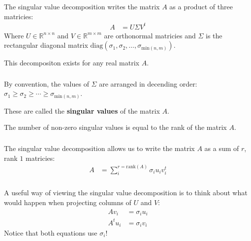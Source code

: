 \begin{frame}[fragile] \frametitle{}

The singular value decomposition writes the matrix $A$ as a product
of three matricies:
\begin{align*}
A &= U \Sigma V^t
\end{align*}
Where $U \in \mathbb{R}^{n\times n}$ and $V \in \mathbb{R}^{m\times m}$
are orthonormal matricies and $\Sigma$ is the rectangular diagonal matrix
$\text{diag}(\sigma_1, \sigma_2, \ldots, \sigma_{\text{min}(n,m)})$.

\pause This decompositon exists for any real matrix $A$.

\end{frame}

\begin{frame}[fragile] \frametitle{}

By convention, the values of $\Sigma$ are arranged in decending
order: $\sigma_1 \geq \sigma_2 \geq \cdots \geq \sigma_{\text{min}(n,m)}$.

\pause These are called the \textbf{singular values} of the matrix $A$.

\pause The number of non-zero singular values is equal to the rank of the
matrix $A$.

\end{frame}

\begin{frame}[fragile] \frametitle{}

The singular value decomposition allows us to write the matrix $A$ as a sum
of $r$, rank $1$ matricies:
\begin{align*}
A &= \sum_i^{r=\text{rank}(A)} \sigma_i u_i v_i^t
\end{align*}

\end{frame}

\begin{frame}[fragile] \frametitle{}

A useful way of viewing the singular value decomposition is to think about
what would happen when projecting columns of $U$ and $V$:
\begin{align*}
A v_i &= \sigma_i u_i \\
A^t u_i &= \sigma_i v_i
\end{align*}
\pause Notice that both equations use $\sigma_i$!

\end{frame}

